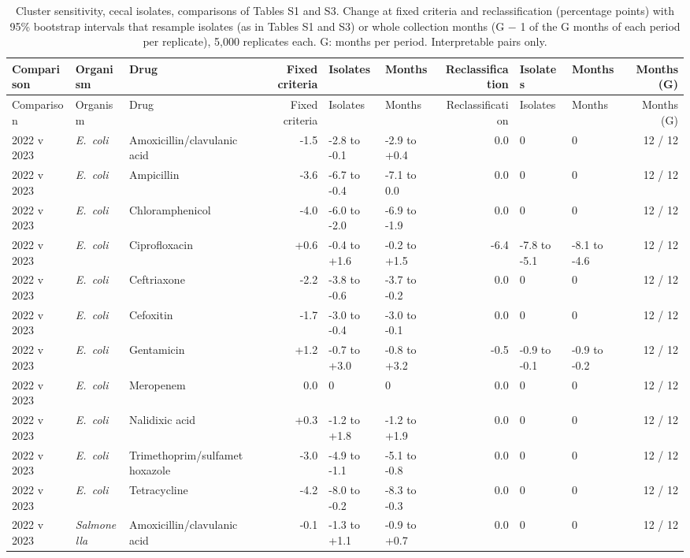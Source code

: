 \clearpage
{\scriptsize
\begin{longtable}{lllrllrllr}
\caption{Cluster sensitivity, cecal isolates, comparisons of Tables S1 and S3. Change at fixed criteria and reclassification (percentage points) with 95\% bootstrap intervals that resample isolates (as in Tables S1 and S3) or whole collection months (G $-$ 1 of the G months of each period per replicate), 5,000 replicates each. G: months per period. Interpretable pairs only.}\\
\toprule
Comparison & Organism & Drug & Fixed criteria & Isolates & Months & Reclassification & Isolates & Months & Months (G) \\
\midrule
\endfirsthead
\toprule
Comparison & Organism & Drug & Fixed criteria & Isolates & Months & Reclassification & Isolates & Months & Months (G) \\
\midrule
\endhead
2022 v 2023 & \textit{E.~coli} & Amoxicillin/clavulanic acid & -1.5 & -2.8 to -0.1 & -2.9 to +0.4 & 0.0 & 0 & 0 & 12 / 12 \\
2022 v 2023 & \textit{E.~coli} & Ampicillin & -3.6 & -6.7 to -0.4 & -7.1 to 0.0 & 0.0 & 0 & 0 & 12 / 12 \\
2022 v 2023 & \textit{E.~coli} & Chloramphenicol & -4.0 & -6.0 to -2.0 & -6.9 to -1.9 & 0.0 & 0 & 0 & 12 / 12 \\
2022 v 2023 & \textit{E.~coli} & Ciprofloxacin & +0.6 & -0.4 to +1.6 & -0.2 to +1.5 & -6.4 & -7.8 to -5.1 & -8.1 to -4.6 & 12 / 12 \\
2022 v 2023 & \textit{E.~coli} & Ceftriaxone & -2.2 & -3.8 to -0.6 & -3.7 to -0.2 & 0.0 & 0 & 0 & 12 / 12 \\
2022 v 2023 & \textit{E.~coli} & Cefoxitin & -1.7 & -3.0 to -0.4 & -3.0 to -0.1 & 0.0 & 0 & 0 & 12 / 12 \\
2022 v 2023 & \textit{E.~coli} & Gentamicin & +1.2 & -0.7 to +3.0 & -0.8 to +3.2 & -0.5 & -0.9 to -0.1 & -0.9 to -0.2 & 12 / 12 \\
2022 v 2023 & \textit{E.~coli} & Meropenem & 0.0 & 0 & 0 & 0.0 & 0 & 0 & 12 / 12 \\
2022 v 2023 & \textit{E.~coli} & Nalidixic acid & +0.3 & -1.2 to +1.8 & -1.2 to +1.9 & 0.0 & 0 & 0 & 12 / 12 \\
2022 v 2023 & \textit{E.~coli} & Trimethoprim/sulfamethoxazole & -3.0 & -4.9 to -1.1 & -5.1 to -0.8 & 0.0 & 0 & 0 & 12 / 12 \\
2022 v 2023 & \textit{E.~coli} & Tetracycline & -4.2 & -8.0 to -0.2 & -8.3 to -0.3 & 0.0 & 0 & 0 & 12 / 12 \\
2022 v 2023 & \textit{Salmonella} & Amoxicillin/clavulanic acid & -0.1 & -1.3 to +1.1 & -0.9 to +0.7 & 0.0 & 0 & 0 & 12 / 12 \\

\end{longtable}}
